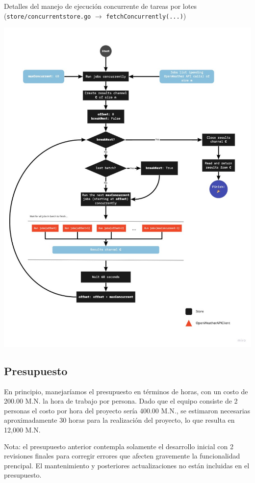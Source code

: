 \documentclass[10pt, letterpaper]{article}
\begin{document}
Detalles del manejo de ejecución concurrente de tareas por lotes\\
(\texttt{store/concurrentstore.go} $\rightarrow$ \texttt{fetchConcurrently(...)})
\begin{center}
  \includegraphics[scale=0.5]{flow-chart-3.jpg}
\end{center}
\clearpage

\subsection{Presupuesto}
En principio, manejaríamos el presupuesto en términos de horas, con un costo de 200.00 M.N. la hora de trabajo por persona. Dado que el equipo consiste de 2 personas el costo por hora del proyecto sería 400.00 M.N., se estimaron necesarias aproximadamente 30 horas para la realización del proyecto, lo que resulta en 12,000 M.N.

Nota: el presupuesto anterior contempla solamente el desarrollo inicial con 2 revisiones finales para corregir errores que afecten gravemente la funcionalidad prencipal. El mantenimiento y posteriores actualizaciones no están incluidas en el presupuesto. 
\end{document}
